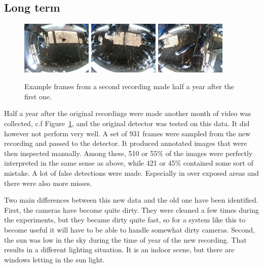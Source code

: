 \documentclass{cta-author}
\begin{document}
\subsection{Long term}
\begin{figure}[tb]
\begin{center}
  \includegraphics[width=0.3\textwidth]{new-2.jpg}
  \includegraphics[width=0.3\textwidth]{new-1.jpg}
  \includegraphics[width=0.3\textwidth]{new-0.jpg}
\end{center}
  \caption{Example frames from a second recording made half a year after the first one.}
  \label{fig:new}
\end{figure}

Half a year after the original recordings were made another month of video was collected, c.f Figure~\ref{fig:new}, and the original detector was tested on this data. It did however not perform very well. A set of 931 frames were sampled from the new recording and passed to the detector. It produced annotated images that were then inspected manually. Among these, 510 or 55\% of the images were perfectly interpreted in the same sense as above, while 421 or 45\% contained some sort of mistake.
A lot of false detections were made. Especially in over exposed areas and there were also more misses. 

Two main differences between this new data and the old one have been identified. 
First, the cameras have become quite dirty. They were cleaned a few times during the experiments, but they became dirty quite fast, so for a system like this to become useful it will have to be able to handle somewhat dirty cameras. Second, the sun was low in the sky during  the time of year of the new recording. That results in a different lighting situation. It is an indoor scene, but there are windows letting in the sun light.
\end{document}
